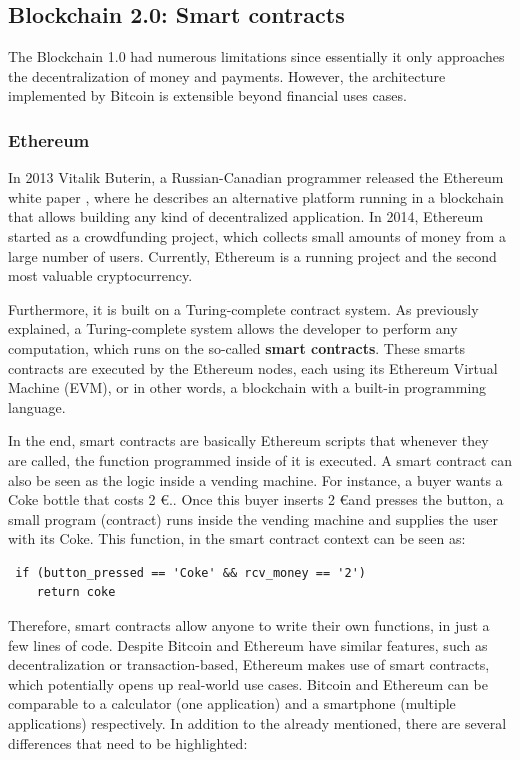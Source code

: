 \subsection{Blockchain 2.0: Smart contracts}

The Blockchain 1.0 had numerous limitations since essentially it only approaches the decentralization of money and payments. However, the architecture implemented by Bitcoin is extensible beyond financial uses cases.

\subsubsection{Ethereum}

In 2013 Vitalik Buterin, a Russian-Canadian programmer released the Ethereum white paper \cite{buterin2014next}, where he describes an alternative platform running in a blockchain that allows building any kind of decentralized application. In 2014, Ethereum started as a crowdfunding project, which collects small amounts of money from a large number of users. Currently, Ethereum is a running project and the second most valuable cryptocurrency.

Furthermore, it is built on a Turing-complete contract system. As previously explained, a Turing-complete system allows the developer to perform any computation, which runs on the so-called \textbf{smart contracts}. These smarts contracts are executed by the Ethereum nodes, each using its Ethereum Virtual Machine (EVM), or in other words, a blockchain with a built-in programming language.

In the end, smart contracts are basically Ethereum scripts that whenever they are called, the function programmed inside of it is executed. A smart contract can also be seen as the logic inside a vending machine. For instance, a buyer wants a Coke bottle that costs 2 \euro.. Once this buyer inserts 2 \euro and presses the button, a small program (contract) runs inside the vending machine and supplies the user with its Coke. This function, in the smart contract context can be seen as:
\newline
\begin{lstlisting}
 if (button_pressed == 'Coke' && rcv_money == '2')
 	return coke
\end{lstlisting}

Therefore, smart contracts allow anyone to write their own functions, in just a few lines of code. Despite Bitcoin and Ethereum have similar features, such as decentralization or transaction-based, Ethereum makes use of smart contracts, which potentially opens up real-world use cases. Bitcoin and Ethereum can be comparable to a calculator (one application) and a smartphone (multiple applications) respectively. In addition to the already mentioned, there are several differences that need to be highlighted:

